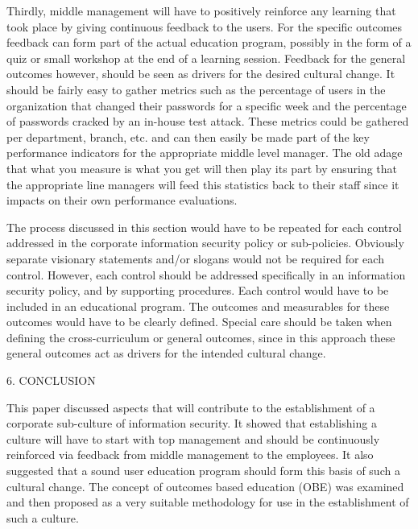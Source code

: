 Thirdly, middle management will have to positively reinforce any
learning that took place by giving continuous feedback to the
users. For the specific outcomes feedback can form part of the
actual education program, possibly in the form of a quiz or small
workshop at the end of a learning session. Feedback for the
general outcomes however, should be seen as drivers for the
desired cultural change. It should be fairly easy to gather
metrics such as the percentage of users in the organization that
changed their passwords for a specific week and the percentage of
passwords cracked by an in-house test attack. These metrics could
be gathered per department, branch, etc. and can then easily be
made part of the key performance indicators for the appropriate
middle level manager. The old adage that what you measure is what
you get will then play its part by ensuring that the appropriate
line managers will feed this statistics back to their staff since
it impacts on their own performance evaluations.

The process discussed in this section would have to be repeated
for each control addressed in the corporate information security
policy or sub-policies. Obviously separate visionary statements
and/or slogans would not be required for each control. However,
each control should be addressed specifically in an information
security policy, and by supporting procedures. Each control would
have to be included in an educational program. The outcomes and
measurables for these outcomes would have to be clearly defined.
Special care should be taken when defining the cross-curriculum or
general outcomes, since in this approach these general outcomes
act as drivers for the intended cultural change.

6.  CONCLUSION

This paper discussed aspects that will contribute to the
establishment of a corporate sub-culture of information security.
It showed that establishing a culture will have to start with top
management and should be continuously reinforced via feedback from
middle management to the employees. It also suggested that a sound
user education program should form this basis of such a cultural
change. The concept of outcomes based education (OBE) was examined
and then proposed as a very suitable methodology for use in the
establishment of such a culture.

